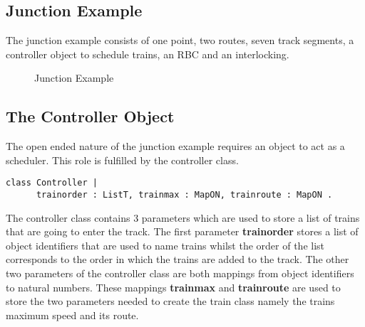 \subsection*{Junction Example}
The junction example consists of one point, two routes, seven track segments, a controller object to schedule trains, an RBC and an interlocking.

\begin{figure}[h!]
\begin{center}
\end{center} 
\caption{Junction Example}
\label{fig:junctionexample}
\end{figure}

\subsection*{The Controller Object}
The open ended nature of the junction example requires an object to act as a scheduler. This role is fulfilled by the controller class. 

\begin{lstlisting}[caption = "Controller Class"]
class Controller | 
      trainorder : ListT, trainmax : MapON, trainroute : MapON .
\end{lstlisting}

The controller class contains 3 parameters which are used to store a list of trains that are going to enter the track. The first parameter \textbf{trainorder} stores a list of object identifiers that are used to name trains whilst the order of the list corresponds to the order in which the trains are added to the track. The other two parameters of the controller class are both mappings from object identifiers to natural numbers. These mappings \textbf{trainmax} and \textbf{trainroute} are used to store the two parameters needed to create the train class namely the trains maximum speed and its route.

